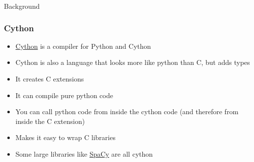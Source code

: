 \documentclass{beamer}
\theoremstyle{case}
\begin{document}
\begin{section}{Background}
\begin{frame}
    \frametitle{Cython}
    \begin{itemize}
        \item<1-> \href{https://cython.org/}{Cython} is a compiler for Python and Cython
        \item<2-> Cython is also a language that looks more like python than C, but adds types
        \item<3-> It creates C extensions
        \item<4-> It can compile pure python code
        \item<5-> You can call python code from inside the cython code (and therefore from inside the C extension)
        \item<6-> Makes it easy to wrap C libraries
        \item<7-> Some large libraries like \href{https://spacy.io/}{SpaCy} are all cython
    \end{itemize}
\end{frame}

\end{section} %
\end{document}
